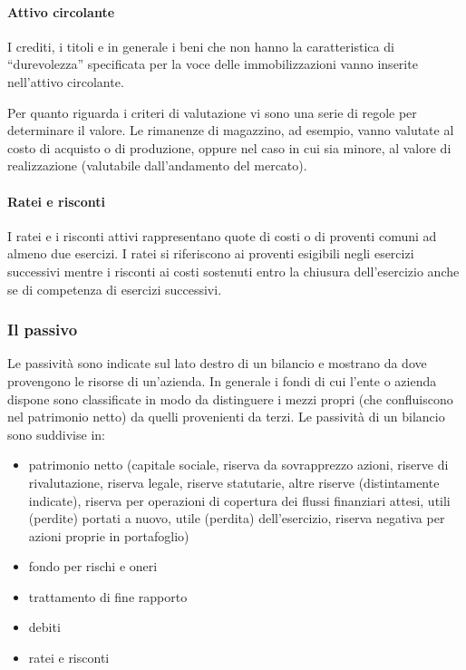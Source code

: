 \paragraph{Attivo circolante}
I crediti, i titoli e in generale i beni che non hanno la caratteristica di “durevolezza” specificata per la voce delle immobilizzazioni vanno inserite nell’attivo circolante.

Per quanto riguarda i criteri di valutazione vi sono una serie di regole per determinare il valore. Le rimanenze di magazzino, ad esempio, vanno valutate al costo di acquisto o di produzione, oppure nel caso in cui sia minore, al valore di realizzazione (valutabile dall’andamento del mercato).

\paragraph{Ratei e risconti}
I ratei e i risconti attivi rappresentano quote di costi o di proventi comuni ad almeno due esercizi. I ratei si riferiscono ai proventi esigibili negli esercizi successivi mentre i risconti ai costi sostenuti entro la chiusura dell’esercizio anche se di competenza di esercizi successivi.

\subsubsection{Il passivo}
Le passività sono indicate sul lato destro di un bilancio e mostrano da dove provengono le risorse di un’azienda. In generale i fondi di cui l’ente o azienda dispone sono classificate in modo da distinguere i mezzi propri (che confluiscono nel patrimonio netto) da quelli provenienti da terzi. Le passività di un bilancio sono suddivise in:
\begin{itemize}
	\item patrimonio netto (capitale sociale, riserva da sovrapprezzo azioni, riserve di rivalutazione, riserva legale, riserve statutarie, altre riserve (distintamente indicate), riserva per operazioni di copertura dei flussi finanziari attesi, utili (perdite) portati a nuovo, utile (perdita) dell’esercizio, riserva negativa per azioni proprie in portafoglio)
	\item fondo per rischi e oneri
	\item trattamento di fine rapporto
	\item debiti
	\item ratei e risconti
\end{itemize}

